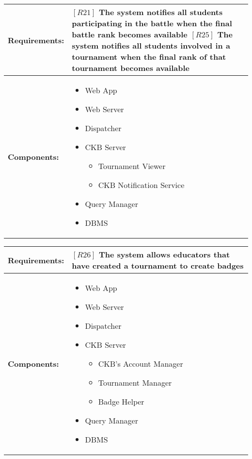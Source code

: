 \begin{table}[H]
  \centering
  \begin{tabularx}{\textwidth}{|p{3cm}|X|}
    \hline
    \textbf{Requirements:} &
    $[R21]$ The system notifies all students participating in the battle when the final battle rank becomes available 
    \newline$[R25]$ The system notifies all students involved in a tournament when the final rank of that tournament becomes available
    \\
    \hline
    \textbf{Components:} & 
    \begin{itemize}
        \item Web App
        \item Web Server 
        \item Dispatcher
        \item CKB Server 
        \begin{itemize}
            \item Tournament Viewer
            \item CKB Notification Service
        \end{itemize}
        \item Query Manager 
        \item DBMS
    \end{itemize}
    \\
    \hline
  \end{tabularx}
\end{table}


\begin{table}[H]
  \centering
  \begin{tabularx}{\textwidth}{|p{3cm}|X|}
    \hline
    \textbf{Requirements:} &
    $[R26]$ The system allows educators that have created a tournament to create badges 
    \\
    \hline
    \textbf{Components:} & 
    \begin{itemize}
        \item Web App
        \item Web Server 
        \item Dispatcher
        \item CKB Server 
        \begin{itemize}
            \item CKB's Account Manager
            \item Tournament Manager
            \item Badge Helper 
        \end{itemize}
        \item Query Manager 
        \item DBMS
    \end{itemize}
    \\
    \hline
  \end{tabularx}
\end{table}


